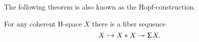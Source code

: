 The following theorem is also known as the Hopf-construction.

\begin{thm}\label{thm:hopf_construction}
For any coherent H-space $X$ there is a fiber sequence
\begin{equation*}
X \hookrightarrow {X}\ast_{}{X} \twoheadrightarrow \mathsf{\Sigma}^{} X.
\end{equation*}
\end{thm}
